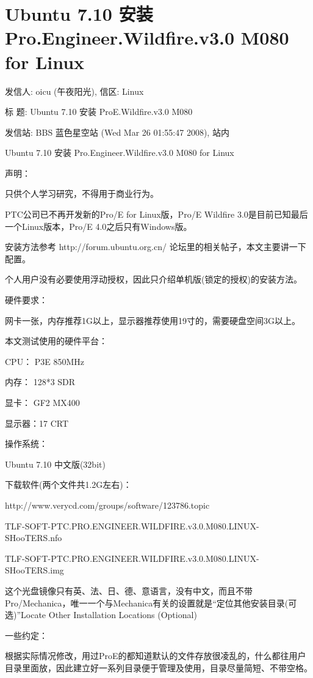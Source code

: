 \chapter{Ubuntu 7.10 安装 Pro.Engineer.Wildfire.v3.0 M080 for Linux}



发信人: oicu (午夜阳光), 信区: Linux

标  题: Ubuntu 7.10 安装 ProE.Wildfire.v3.0 M080

发信站: BBS 蓝色星空站 (Wed Mar 26 01:55:47 2008), 站内

Ubuntu 7.10 安装 Pro.Engineer.Wildfire.v3.0 M080 for Linux\cite{linux_install_proe}

声明：

只供个人学习研究，不得用于商业行为。

PTC公司已不再开发新的Pro/E for Linux版，Pro/E Wildfire 3.0是目前已知最后一个Linux版本，Pro/E 4.0之后只有Windows版。

安装方法参考 http://forum.ubuntu.org.cn/ 论坛里的相关帖子，本文主要讲一下配置。

个人用户没有必要使用浮动授权，因此只介绍单机版(锁定的授权)的安装方法。

硬件要求：

网卡一张，内存推荐1G以上，显示器推荐使用19寸的，需要硬盘空间3G以上。

本文测试使用的硬件平台：

CPU：   P3E 850MHz

内存：  128*3 SDR

显卡：  GF2 MX400

显示器：17 CRT

操作系统：

Ubuntu 7.10 中文版(32bit)

下载软件(两个文件共1.2G左右)：

http://www.verycd.com/groups/software/123786.topic

TLF-SOFT-PTC.PRO.ENGINEER.WILDFIRE.v3.0.M080.LINUX-SHooTERS.nfo

TLF-SOFT-PTC.PRO.ENGINEER.WILDFIRE.v3.0.M080.LINUX-SHooTERS.img


这个光盘镜像只有英、法、日、德、意语言，没有中文，而且不带Pro/Mechanica，唯一一个与Mechanica有关的设置就是“定位其他安装目录(可选)”Locate Other Installation Locations (Optional)


一些约定：

根据实际情况修改，用过ProE的都知道默认的文件存放很凌乱的，什么都往用户目录里面放，因此建立好一系列目录便于管理及使用，目录尽量简短、不带空格。

